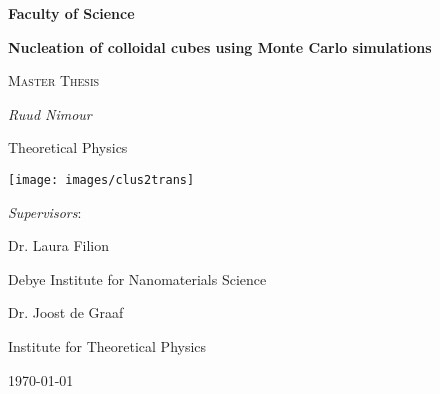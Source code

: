 \documentclass[thesis]{subfiles}
\begin{document}
\begin{titlepage}
    \begin{flushright}
    {\LARGE\bfseries Faculty of Science \par} %
    \end{flushright}
	\vspace{1cm}
    \begin{center}
    {\huge\bfseries Nucleation of colloidal cubes using Monte Carlo simulations\par} %
    \end{center}
	\vspace{1cm}
    {\scshape\Large Master Thesis\par}
	\vspace{0.75cm} %
	{\Large\itshape Ruud Nimour\par} %
    \vspace{0.5cm}
    {\Large Theoretical Physics}\par %
    \vspace{-3cm}
    \centering
    \texttt{[image: images/clus2trans]}%
    \vspace{-1cm}
    \par
    \raggedleft
	{\Large\itshape Supervisors}:\par\vspace{0.25cm}
	{\large Dr. Laura Filion\par} %
    Debye Institute for Nanomaterials Science\par %
    \vspace{0.25cm}
    {\large Dr. Joost de Graaf\par} %
    Institute for Theoretical Physics %

	\vfill
	{\large \today\par}%
    
\end{titlepage}    

\restoregeometry %
\end{document}
